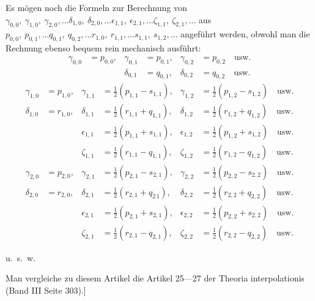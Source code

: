 \begin{landscape}
\par\noindent\hspace*{\parindent}Es mögen noch die Formeln zur Berechnung von \(\gamma_{0,0},\allowbreak\ \gamma_{1,0},\allowbreak\ \gamma_{2,0},\allowbreak\ldots\delta_{1,0},\allowbreak\ \delta_{2,0},\allowbreak\ldots\epsilon_{1,1},\allowbreak\ \epsilon_{2,1},\allowbreak\ldots\zeta_{1,1},\allowbreak\ \zeta_{2,1},\allowbreak\ldots\) aus \(p_{0,0},\allowbreak\ p_{0,1},\allowbreak\ldots q_{0,1},\allowbreak\ q_{0,2},\allowbreak\ldots r_{1,0},\allowbreak\ r_{1,1},\allowbreak\ldots s_{1,1},\allowbreak\ s_{1,2},\allowbreak\ldots\) angeführt werden, obwohl man die Rechnung ebenso bequem rein mechanisch ausführt:
\[
\begin{aligned}
\gamma_{0,0}&=p_{0,0},&\gamma_{0,1}&=p_{0,1},&\gamma_{0,2}&=p_{0,2}\quad\text{usw.}\\
&&\delta_{0,1}&=q_{0,1},&\delta_{0,2}&=q_{0,2}\quad\text{usw.}
\end{aligned}
\]
\[
\begin{aligned}
\gamma_{1,0}&=p_{1,0},&\gamma_{1,1}&=\tfrac12(p_{1,1}-s_{1,1}),&\gamma_{1,2}&=\tfrac12(p_{1,2}-s_{1,2})\quad\text{usw.}\\
\delta_{1,0}&=r_{1,0},&\delta_{1,1}&=\tfrac12(r_{1,1}+q_{1,1}),&\delta_{1,2}&=\tfrac12(r_{1,2}+q_{1,2})\quad\text{usw.}\\[8pt]
&&\epsilon_{1,1}&=\tfrac12(p_{1,1}+s_{1,1}),&\epsilon_{1,2}&=\tfrac12(p_{1,2}+s_{1,2})\quad\text{usw.}\\
&&\zeta_{1,1}&=\tfrac12(r_{1,1}-q_{1,1}),&\zeta_{1,2}&=\tfrac12(r_{1,2}-q_{1,2})\quad\text{usw.}\\[8pt]
\gamma_{2,0}&=p_{2,0},&\gamma_{2,1}&=\tfrac12(p_{2,1}-s_{2,1}),&\gamma_{2,2}&=\tfrac12(p_{2,2}-s_{2,2})\quad\text{usw.}\\
\delta_{2,0}&=r_{2,0},&\delta_{2,1}&=\tfrac12(r_{2,1}+q_{2\,1}),&\delta_{2,2}&=\tfrac12(r_{2,2}+q_{2,2})\quad\text{usw.}\\[8pt]
&&\epsilon_{2,1}&=\tfrac12(p_{2,1}+s_{2,1}),&\epsilon_{2,2}&=\tfrac12(p_{2,2}+s_{2,2})\quad\text{usw.}\\
&&\zeta_{2,1}&=\tfrac12(r_{2,1}-q_{2,1}),&\zeta_{2,2}&=\tfrac12(r_{2,2}-q_{2,2})\quad\text{usw.}
\end{aligned}
\]
\begin{center}u.~s.~w.\end{center}
\par\noindent\hspace*{\parindent}Man vergleiche zu diesem Artikel die Artikel 25---27 der Theoria interpolationis (Band III Seite 303).]
\clearpage
\endgroup
\end{landscape}
